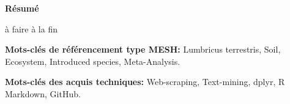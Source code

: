 \documentclass{book}
\begin{document}

\newpage
\thispagestyle{empty}
\begin{center}
    \huge{\textbf{Résumé}}
\end{center}

\vspace{1cm}
à faire à la fin
\vspace{\baselineskip} %
\par
\textbf{Mots-clés de référencement type MESH:} Lumbricus terrestris, Soil, Ecosystem, Introduced species, Meta-Analysis.
\vspace{\baselineskip} %
\par
\textbf{Mots-clés des acquis techniques:} Web-scraping, Text-mining, dplyr, R Markdown, GitHub.
\end{document}
